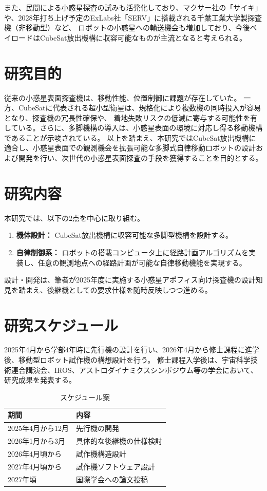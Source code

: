 \documentclass[dvipdfmx,titlepage,a4j]{jsarticle}
\begin{document}
また、民間による小惑星探査の試みも活発化しており、マクサー社の「サイキ」や、2028年打ち上げ予定のExLabs社「SERV」に搭載される千葉工業大学製探査機（非移動型）など、
ロボットの小惑星への輸送機会も増加しており、今後ペイロードはCubeSat放出機構に収容可能なものが主流となると考えられる。

\section{研究目的}
従来の小惑星表面探査機は、移動性能、位置制御に課題が存在していた。
一方、CubeSatに代表される超小型衛星は、規格化により複数機の同時投入が容易となり、探査機の冗長性確保や、
着地失敗リスクの低減に寄与する可能性を有している。さらに、多脚機構の導入は、小惑星表面の環境に対応し得る移動機構であることが示唆されている。
以上を踏まえ、本研究ではCubeSat放出機構に適合し、小惑星表面での観測機会を拡張可能な多脚式自律移動ロボットの設計および開発を行い、次世代の小惑星表面探査の手段を獲得することを目的とする。
\section{研究内容}
本研究では、以下の2点を中心に取り組む。

\begin{enumerate}
    \item \textbf{機体設計：}
          CubeSat放出機構に収容可能な多脚型機構を設計する。
    \item \textbf{自律制御系：}
          ロボットの搭載コンピュータ上に経路計画アルゴリズムを実装し、任意の観測地点への経路計画が可能な自律移動機能を実現する。
\end{enumerate}
設計・開発は、筆者が2025年度に実施する小惑星アポフィス向け探査機の設計知見を踏まえ、後継機としての要求仕様を随時反映しつつ進める。


\section{研究スケジュール}
2025年4月から学部4年時に先行機の設計を行い、2026年4月から修士課程に進学後、移動型ロボット試作機の構想設計を行う。
修士課程入学後は、宇宙科学技術連合講演会、IROS、アストロダイナミクスシンポジウム等の学会において、研究成果を発表する。

\begin{table}[H]
    \centering
    \caption{スケジュール案}
    \begin{tabular}{l|l}
        \hline
        期間           & 内容           \\
        \hline \hline
        2025年4月から12月 & 先行機の開発       \\
        \hline
        2026年1月から3月  & 具体的な後継機の仕様検討 \\
        \hline
        2026年4月頃から   & 試作機構造設計      \\
        \hline
        2027年4月頃から   & 試作機ソフトウェア設計  \\
        \hline
        2027年頃       & 国際学会への論文投稿   \\
        \hline
    \end{tabular}
    \label{tab:schedule}
\end{table}
\end{document}
